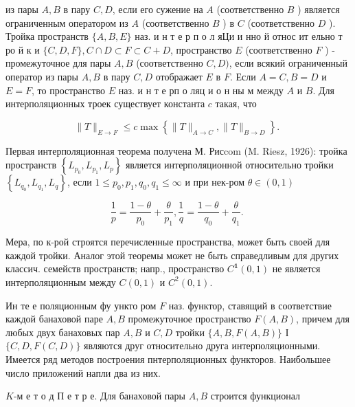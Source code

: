 \documentclass[10pt]{article}
\begin{document}
из пары $A, B$ в пару $C, D$, если его сужение на $A$ (соответственно $B$ ) является ограниченным оператором из $A$ (соответственно $B$ ) в $C$ (соответственно $D$ ). Тройка пространств $\{A, B, E\}$ наз. и н т е р п о л яЦи и нно й относ ит ельно т ро й к и $\{C, D, F\}, C \cap D \subset F \subset C+D$, пространство $E$ (соответственно $F$ ) - промежуточное для пары $A, B$ (соответственно $C, D)$, если всякий ограниченный оператор из пары $A, B$ в пару $C, D$ отображает $E$ в $F$. Если $A=C, B=D$ и $E=F$, то пространство $E$ наз. и н т е рп о ляц и о н ны м между $A$ и $B$. Для интерполяционных троек существует константа $c$ такая, что



\[

\|T\|_{E \rightarrow F} \leqslant c \max \left\{\|T\|_{A \rightarrow C},\|T\|_{B \rightarrow D}\right\} \text {. }

\]



Первая интерполяционная теорема получена М. Рисcom (M. Riesz, 1926): тройка пространств $\left\{L_{p_{0}}, L_{p_{1}}, L_{p}\right\}$ является интерполяционной относительно тройки $\left\{L_{q_{0}}, L_{q_{1}}, L_{q}\right\}$, если $1 \leqslant p_{0}, p_{1}, q_{0}, q_{1} \leqslant \infty$ и при нек-ром $\theta \in(0,1)$



\[

\frac{1}{p}=\frac{1-\theta}{p_{0}}+\frac{\theta}{p_{1}}, \frac{1}{q}=\frac{1-\theta}{q_{0}}+\frac{\theta}{q_{1}} \text {. }

\]



Мера, по к-рой строятся перечисленные пространства, может быть своей для каждой тройки. Аналог этой теоремы может не быть справедливым для других классич. семейств пространств; напр., пространство $C^{\mathbf{1}}(0,1)$ не является интерполяционным между $C(0,1)$ и $C^{2}(0,1)$.



Ин те е поляционным фу ункто ром $F$ наз. функтор, ставящий в соответствие каждой банаховой паре $A, B$ промежуточное пространство $F(A, B)$, причем для любых двух банаховых пар $A, B$ и $C, D$ тройки $\{A, B, F(A, B)\}$ І $\{C, D, F(C, D)\}$ являются друг относительно друга интерполяционными. Имеется ряд методов построения пнтерполяционных функторов. Наибольшее число приложений напли два из них.



$K$-м е т о д П е т р е. Для банаховой пары $A, B$ строится функционал
\end{document}

